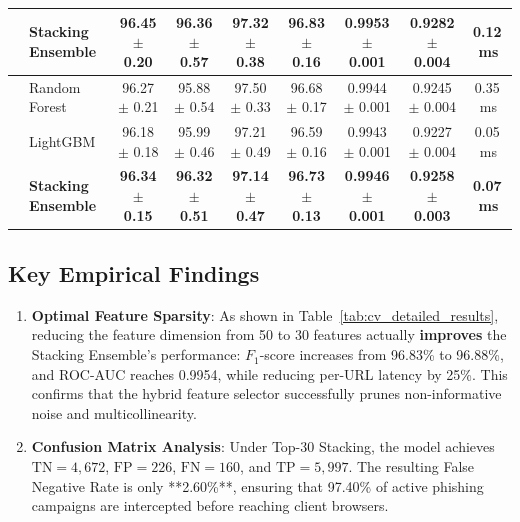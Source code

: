 \documentclass[journal]{IEEEtran}
\begin{document}
\begin{table}[t]
\begin{tabular}{llccccccc}
 & \textbf{Stacking Ensemble} & \textbf{96.45 $\pm$ 0.20} & \textbf{96.36 $\pm$ 0.57} & \textbf{97.32 $\pm$ 0.38} & \textbf{96.83 $\pm$ 0.16} & \textbf{0.9953 $\pm$ 0.001} & \textbf{0.9282 $\pm$ 0.004} & \textbf{0.12\,ms} \\
\midrule
{} 
 & Random Forest & 96.27 $\pm$ 0.21 & 95.88 $\pm$ 0.54 & 97.50 $\pm$ 0.33 & 96.68 $\pm$ 0.17 & 0.9944 $\pm$ 0.001 & 0.9245 $\pm$ 0.004 & 0.35\,ms \\
 & LightGBM & 96.18 $\pm$ 0.18 & 95.99 $\pm$ 0.46 & 97.21 $\pm$ 0.49 & 96.59 $\pm$ 0.16 & 0.9943 $\pm$ 0.001 & 0.9227 $\pm$ 0.004 & 0.05\,ms \\
 & \textbf{Stacking Ensemble} & \textbf{96.34 $\pm$ 0.15} & \textbf{96.32 $\pm$ 0.51} & \textbf{97.14 $\pm$ 0.47} & \textbf{96.73 $\pm$ 0.13} & \textbf{0.9946 $\pm$ 0.001} & \textbf{0.9258 $\pm$ 0.003} & \textbf{0.07\,ms} \\
\bottomrule
\end{tabular}
\end{table}

\subsection{Key Empirical Findings}
\begin{enumerate}
    \item \textbf{Optimal Feature Sparsity}: As shown in Table~\ref{tab:cv_detailed_results}, reducing the feature dimension from 50 to 30 features actually \textbf{improves} the Stacking Ensemble's performance: $F_1$-score increases from 96.83\% to 96.88\%, and ROC-AUC reaches 0.9954, while reducing per-URL latency by 25\%. This confirms that the hybrid feature selector successfully prunes non-informative noise and multicollinearity.
    \item \textbf{Confusion Matrix Analysis}: Under Top-30 Stacking, the model achieves $\text{TN} = 4,672$, $\text{FP} = 226$, $\text{FN} = 160$, and $\text{TP} = 5,997$. The resulting False Negative Rate is only **2.60\%**, ensuring that 97.40\% of active phishing campaigns are intercepted before reaching client browsers.
\end{enumerate}
\end{document}
